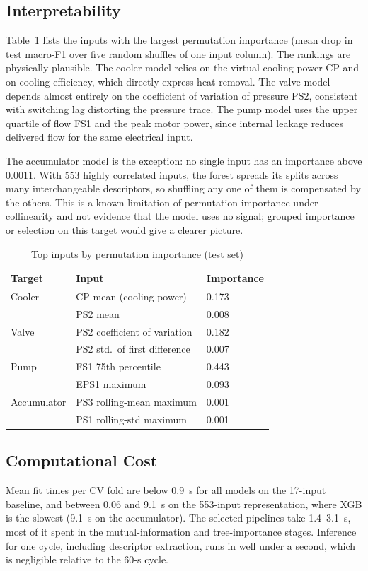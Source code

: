 \documentclass[conference]{IEEEtran}
\begin{document}
\subsection{Interpretability}
Table~\ref{tab:imp} lists the inputs with the largest permutation importance
(mean drop in test macro-F1 over five random shuffles of one input column). The rankings are
physically plausible. The cooler model relies on the virtual cooling power CP
and on cooling efficiency, which directly express heat removal. The valve
model depends almost entirely on the coefficient of variation of pressure
PS2, consistent with switching lag distorting the pressure trace. The pump
model uses the upper quartile of flow FS1 and the peak motor power, since
internal leakage reduces delivered flow for the same electrical input.

The accumulator model is the exception: no single input has an importance
above 0.0011. With 553 highly correlated inputs, the forest spreads its splits
across many interchangeable descriptors, so shuffling any one of them is
compensated by the others. This is a known limitation of permutation
importance under collinearity and not evidence that the model uses no signal;
grouped importance or selection on this target would give a clearer picture.

\begin{table}[t]
\centering
\caption{Top inputs by permutation importance (test set)}
\label{tab:imp}
\begin{tabular}{@{}lll@{}}
\toprule
Target & Input & Importance \\
\midrule
Cooler & CP mean (cooling power) & 0.173 \\
       & PS2 mean & 0.008 \\
Valve  & PS2 coefficient of variation & 0.182 \\
       & PS2 std.\ of first difference & 0.007 \\
Pump   & FS1 75th percentile & 0.443 \\
       & EPS1 maximum & 0.093 \\
Accumulator & PS3 rolling-mean maximum & 0.001 \\
       & PS1 rolling-std maximum & 0.001 \\
\bottomrule
\end{tabular}
\end{table}

\subsection{Computational Cost}
Mean fit times per CV fold are below 0.9~s for all models on the 17-input
baseline, and between 0.06 and 9.1~s on the 553-input representation, where XGB
is the slowest (9.1~s on the accumulator). The selected pipelines take
1.4--3.1~s, most of it spent in the mutual-information and tree-importance
stages. Inference for one cycle, including descriptor extraction, runs in well
under a second, which is negligible relative to the 60-s cycle.
\end{document}
